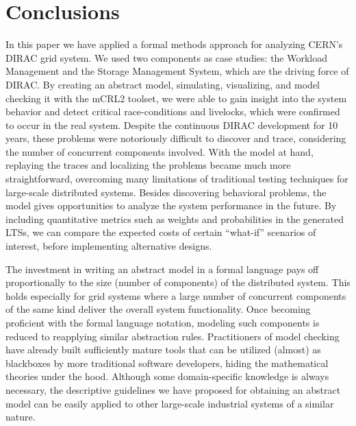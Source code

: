 \documentclass[10pt,conference]{IEEEtran}
\begin{document}
\section{Conclusions}
\label{sec:Section_5}
In this paper we have applied a formal methods approach for analyzing CERN's 
DIRAC grid system. 
We used two components as case studies: the Workload
Management and the Storage Management System, which are the driving force 
of DIRAC.
By creating an abstract model, simulating, visualizing, and model checking it with the mCRL2 toolset,
we were able to gain insight into the system behavior and detect critical
race-conditions and livelocks, which  
were confirmed to occur in the real system. 
Despite the continuous DIRAC development for 10 years, these problems 
were notoriously difficult to discover and trace, considering the number of concurrent components involved. 
With the model at hand, replaying
the traces and localizing the problems became much more straightforward, overcoming many limitations of
traditional testing techniques for large-scale distributed systems. Besides 
discovering behavioral problems, the 
model gives opportunities to analyze the system performance in the future.
By including quantitative metrics such as weights and probabilities in the generated LTSs,
we can compare the expected costs of certain ``what-if'' scenarios 
of interest, before implementing alternative designs.

The investment in writing an abstract model in a formal language 
pays off proportionally to the size (number of components) of the distributed system. 
This holds especially for grid systems where a large number of concurrent
 components of the same kind deliver the overall system functionality. 
Once becoming proficient with
the formal language notation, modeling such components is
reduced to reapplying similar abstraction rules.
Practitioners
of model checking have already built sufficiently mature tools
that can be utilized (almost) as blackboxes by more traditional
software developers, hiding the mathematical theories under
the hood. 
Although some domain-specific knowledge is always necessary,
the descriptive guidelines we have proposed for obtaining
an abstract model can be easily 
applied to other large-scale industrial systems of a similar nature.

 

\end{document}
